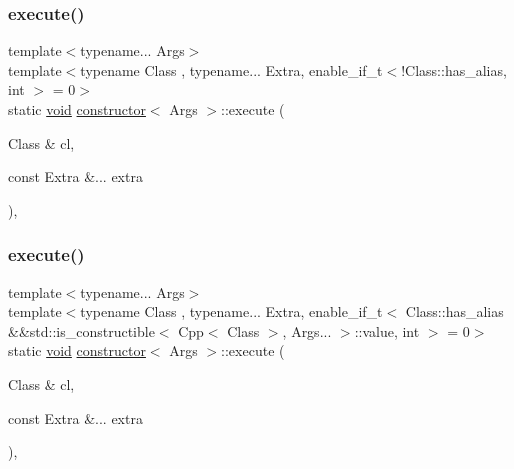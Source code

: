 \subsubsection{\texorpdfstring{execute()}{execute()}\hspace{0.1cm}{\footnotesize\ttfamily [1/3]}}
{\footnotesize\ttfamily template$<$typename... Args$>$ \\
template$<$typename Class , typename... Extra, enable\+\_\+if\+\_\+t$<$!\+Class\+::has\+\_\+alias, int $>$  = 0$>$ \\
static \mbox{\hyperlink{_s_d_l__opengles2__gl2ext_8h_ae5d8fa23ad07c48bb609509eae494c95}{void}} \mbox{\hyperlink{structconstructor}{constructor}}$<$ Args $>$\+::execute (\begin{DoxyParamCaption}\item[{Class \&}]{cl,  }\item[{const Extra \&...}]{extra }\end{DoxyParamCaption})\hspace{0.3cm}{\ttfamily [inline]}, {\ttfamily [static]}}

\mbox{\label{structconstructor_a18005e4a1a32b55cbccf36071f3f62e8}} 
\subsubsection{\texorpdfstring{execute()}{execute()}\hspace{0.1cm}{\footnotesize\ttfamily [2/3]}}
{\footnotesize\ttfamily template$<$typename... Args$>$ \\
template$<$typename Class , typename... Extra, enable\+\_\+if\+\_\+t$<$ Class\+::has\+\_\+alias \&\&std\+::is\+\_\+constructible$<$ Cpp$<$ Class $>$, Args... $>$\+::value, int $>$  = 0$>$ \\
static \mbox{\hyperlink{_s_d_l__opengles2__gl2ext_8h_ae5d8fa23ad07c48bb609509eae494c95}{void}} \mbox{\hyperlink{structconstructor}{constructor}}$<$ Args $>$\+::execute (\begin{DoxyParamCaption}\item[{Class \&}]{cl,  }\item[{const Extra \&...}]{extra }\end{DoxyParamCaption})\hspace{0.3cm}{\ttfamily [inline]}, {\ttfamily [static]}}

